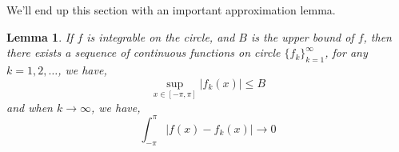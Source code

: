 \documentclass[a4paper]{article}
\newtheorem{lemma}[theorem]{Lemma}
\numberwithin{equation}{subsection}
\begin{document}
\par We'll end up this section with an important approximation lemma.

\begin{lemma}
    If $f$ is integrable on the circle, and $B$ is the upper bound of $f$, then there exists a sequence of continuous functions on circle $\{f_k\}_{k=1}^\infty$, for any $k=1,2,\dots$, we have,
    \begin{equation}
        \sup_{x \in [-\pi, \pi]} \lvert f_k(x) \rvert \leq B
    \end{equation}
    and when $k \rightarrow \infty$, we have,
    \begin{equation}
        \int_{-\pi}^{\pi} \lvert f(x) - f_k(x) \rvert \rightarrow 0
    \end{equation}
\end{lemma}
\end{document}
